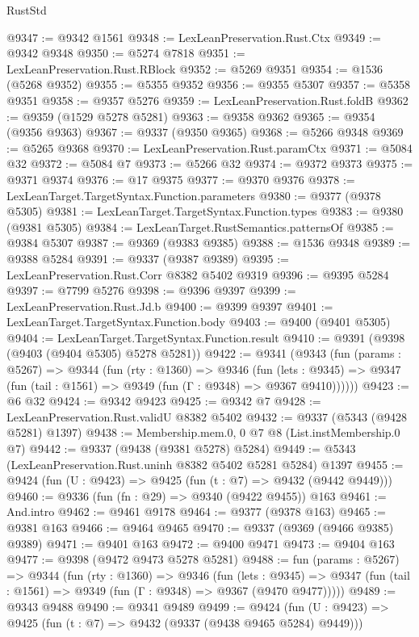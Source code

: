 \begin{lexlean}{RustStd}
\begin{coremodule}
@9347 := @9342 @1561
@9348 := LexLeanPreservation.Rust.Ctx
@9349 := @9342 @9348
@9350 := @5274 @7818
@9351 := LexLeanPreservation.Rust.RBlock
@9352 := @5269 @9351
@9354 := @1536 (@5268 @9352)
@9355 := @5355 @9352
@9356 := @9355 @5307
@9357 := @5358 @9351
@9358 := @9357 @5276
@9359 := LexLeanPreservation.Rust.foldB
@9362 := @9359 (@1529 @5278 @5281)
@9363 := @9358 @9362
@9365 := @9354 (@9356 @9363)
@9367 := @9337 (@9350 @9365)
@9368 := @5266 @9348
@9369 := @5265 @9368
@9370 := LexLeanPreservation.Rust.paramCtx
@9371 := @5084 @32
@9372 := @5084 @7
@9373 := @5266 @32
@9374 := @9372 @9373
@9375 := @9371 @9374
@9376 := @17 @9375
@9377 := @9370 @9376
@9378 := LexLeanTarget.TargetSyntax.Function.parameters
@9380 := @9377 (@9378 @5305)
@9381 := LexLeanTarget.TargetSyntax.Function.types
@9383 := @9380 (@9381 @5305)
@9384 := LexLeanTarget.RustSemantics.patternsOf
@9385 := @9384 @5307
@9387 := @9369 (@9383 @9385)
@9388 := @1536 @9348
@9389 := @9388 @5284
@9391 := @9337 (@9387 @9389)
@9395 := LexLeanPreservation.Rust.Corr @8382 @5402 @9319
@9396 := @9395 @5284
@9397 := @7799 @5276
@9398 := @9396 @9397
@9399 := LexLeanPreservation.Rust.Jd.b
@9400 := @9399 @9397
@9401 := LexLeanTarget.TargetSyntax.Function.body
@9403 := @9400 (@9401 @5305)
@9404 := LexLeanTarget.TargetSyntax.Function.result
@9410 := @9391 (@9398 (@9403 (@9404 @5305) @5278 @5281))
@9422 := @9341
    (@9343
      (fun (params : @5267) =>
      @9344
        (fun (rty : @1360) =>
        @9346
          (fun (lets : @9345) =>
          @9347 (fun (tail : @1561) => @9349 (fun (Γ : @9348) => @9367 @9410))))))
@9423 := @6 @32
@9424 := @9342 @9423
@9425 := @9342 @7
@9428 := LexLeanPreservation.Rust.validU @8382 @5402
@9432 := @9337 (@5343 (@9428 @5281) @1397)
@9438 := Membership.mem.{0, 0} @7 @8 (List.instMembership.{0} @7)
@9442 := @9337 (@9438 (@9381 @5278) @5284)
@9449 := @5343 (LexLeanPreservation.Rust.uninh @8382 @5402 @5281 @5284) @1397
@9455 := @9424 (fun (U : @9423) => @9425 (fun (t : @7) => @9432 (@9442 @9449)))
@9460 := @9336 (fun (fn : @29) => @9340 (@9422 @9455)) @163
@9461 := And.intro
@9462 := @9461 @9178
@9464 := @9377 (@9378 @163)
@9465 := @9381 @163
@9466 := @9464 @9465
@9470 := @9337 (@9369 (@9466 @9385) @9389)
@9471 := @9401 @163
@9472 := @9400 @9471
@9473 := @9404 @163
@9477 := @9398 (@9472 @9473 @5278 @5281)
@9488 := fun (params : @5267) =>
  @9344
    (fun (rty : @1360) =>
    @9346
      (fun (lets : @9345) =>
      @9347 (fun (tail : @1561) => @9349 (fun (Γ : @9348) => @9367 (@9470 @9477)))))
@9489 := @9343 @9488
@9490 := @9341 @9489
@9499 := @9424 (fun (U : @9423) => @9425 (fun (t : @7) => @9432 (@9337 (@9438 @9465 @5284) @9449)))

\end{coremodule}
\end{lexlean}
